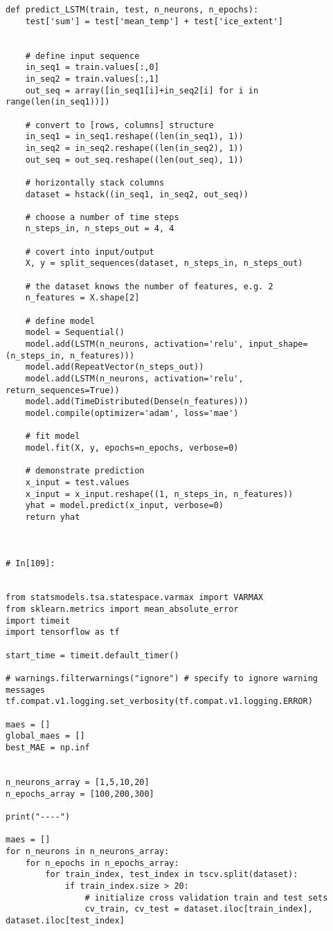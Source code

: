 \begin{verbatim}
def predict_LSTM(train, test, n_neurons, n_epochs):
    test['sum'] = test['mean_temp'] + test['ice_extent']


    # define input sequence
    in_seq1 = train.values[:,0]
    in_seq2 = train.values[:,1]
    out_seq = array([in_seq1[i]+in_seq2[i] for i in range(len(in_seq1))])

    # convert to [rows, columns] structure
    in_seq1 = in_seq1.reshape((len(in_seq1), 1))
    in_seq2 = in_seq2.reshape((len(in_seq2), 1))
    out_seq = out_seq.reshape((len(out_seq), 1))
    
    # horizontally stack columns
    dataset = hstack((in_seq1, in_seq2, out_seq))
    
    # choose a number of time steps
    n_steps_in, n_steps_out = 4, 4
    
    # covert into input/output
    X, y = split_sequences(dataset, n_steps_in, n_steps_out)
    
    # the dataset knows the number of features, e.g. 2
    n_features = X.shape[2]
    
    # define model
    model = Sequential()
    model.add(LSTM(n_neurons, activation='relu', input_shape=(n_steps_in, n_features)))
    model.add(RepeatVector(n_steps_out))
    model.add(LSTM(n_neurons, activation='relu', return_sequences=True))
    model.add(TimeDistributed(Dense(n_features)))
    model.compile(optimizer='adam', loss='mae')
    
    # fit model
    model.fit(X, y, epochs=n_epochs, verbose=0)
    
    # demonstrate prediction
    x_input = test.values
    x_input = x_input.reshape((1, n_steps_in, n_features))
    yhat = model.predict(x_input, verbose=0)
    return yhat
    


# In[109]:


from statsmodels.tsa.statespace.varmax import VARMAX
from sklearn.metrics import mean_absolute_error
import timeit
import tensorflow as tf

start_time = timeit.default_timer()

# warnings.filterwarnings("ignore") # specify to ignore warning messages
tf.compat.v1.logging.set_verbosity(tf.compat.v1.logging.ERROR)

maes = []
global_maes = []
best_MAE = np.inf


n_neurons_array = [1,5,10,20]
n_epochs_array = [100,200,300]

print("----")

maes = []
for n_neurons in n_neurons_array:
    for n_epochs in n_epochs_array:
        for train_index, test_index in tscv.split(dataset):
            if train_index.size > 20:
                # initialize cross validation train and test sets
                cv_train, cv_test = dataset.iloc[train_index], dataset.iloc[test_index]


\end{verbatim}
